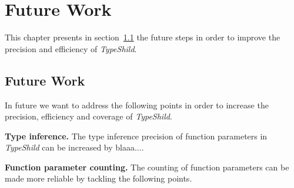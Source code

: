 \chapter{Future Work}
\label{chapter:Future_Work}

This chapter presents in section~\ref{Future Work} the future steps in order to improve the
precision and efficiency of \textit{TypeShild}.

\section{Future Work} 
\label{Future Work} 

In future we want to address the following points in order to increase the precision, efficiency
and coverage of \textit{TypeShild}.

\textbf{Type inference.} The type inference precision of function parameters in \textit{TypeShild} can be 
increased by blaaa....

\textbf{Function parameter counting.}
The counting of function parameters can be made more reliable by tackling the following points.
